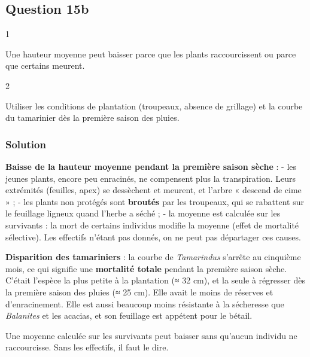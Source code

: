 \documentclass[11pt,a4paper]{article}
\begin{document}
\hypertarget{question-15b}{%
\subsection{Question 15b}\label{question-15b}}

\begin{indication}{1}

Une hauteur moyenne peut baisser parce que les plants raccourcissent ou parce que certains meurent.

\end{indication}

\begin{indication}{2}

Utiliser les conditions de plantation (troupeaux, absence de grillage) et la courbe du tamarinier dès la première saison des pluies.

\end{indication}

\hypertarget{solution-42}{%
\subsubsection{Solution}\label{solution-42}}

\textbf{Baisse de la hauteur moyenne pendant la première saison sèche} :
- les jeunes plants, encore peu enracinés, ne compensent plus la transpiration. Leurs extrémités (feuilles, apex) se dessèchent et meurent, et l'arbre « descend de cime » ;
- les plants non protégés sont \textbf{broutés} par les troupeaux, qui se rabattent sur le feuillage ligneux quand l'herbe a séché ;
- la moyenne est calculée sur les survivants : la mort de certains individus modifie la moyenne (effet de mortalité sélective). Les effectifs n'étant pas donnés, on ne peut pas départager ces causes.

\textbf{Disparition des tamariniers} : la courbe de \emph{Tamarindus} s'arrête au cinquième mois, ce qui signifie une \textbf{mortalité totale} pendant la première saison sèche. C'était l'espèce la plus petite à la plantation (≈ 32 cm), et la seule à régresser dès la première saison des pluies (≈ 25 cm). Elle avait le moins de réserves et d'enracinement. Elle est aussi beaucoup moins résistante à la sécheresse que \emph{Balanites} et les acacias, et son feuillage est appétent pour le bétail.

\begin{piege}

Une moyenne calculée sur les survivants peut baisser sans qu'aucun individu ne raccourcisse. Sans les effectifs, il faut le dire.

\end{piege}
\end{document}
